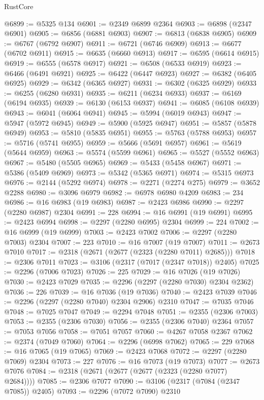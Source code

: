 \begin{lexlean}{RustCore}
\begin{coremodule}
@6899 := @5325 @134
@6901 := @2349 @6899 @2364
@6903 := @6898 (@2347 @6901)
@6905 := @6856 (@6881 @6903)
@6907 := @6813 (@6838 @6905)
@6909 := @6767 (@6792 @6907)
@6911 := @6721 (@6746 @6909)
@6913 := @6677 (@6702 @6911)
@6915 := @6635 (@6660 @6913)
@6917 := @6595 (@6614 @6915)
@6919 := @6555 (@6578 @6917)
@6921 := @6508 (@6533 @6919)
@6923 := @6466 (@6491 @6921)
@6925 := @6422 (@6447 @6923)
@6927 := @6382 (@6405 @6925)
@6929 := @6342 (@6365 @6927)
@6931 := @6302 (@6325 @6929)
@6933 := @6255 (@6280 @6931)
@6935 := @6211 (@6234 @6933)
@6937 := @6169 (@6194 @6935)
@6939 := @6130 (@6153 @6937)
@6941 := @6085 (@6108 @6939)
@6943 := @6041 (@6064 @6941)
@6945 := @5994 (@6019 @6943)
@6947 := @5947 (@5972 @6945)
@6949 := @5900 (@5925 @6947)
@6951 := @5857 (@5878 @6949)
@6953 := @5810 (@5835 @6951)
@6955 := @5763 (@5788 @6953)
@6957 := @5716 (@5741 @6955)
@6959 := @5666 (@5691 @6957)
@6961 := @5619 (@5644 @6959)
@6963 := @5574 (@5599 @6961)
@6965 := @5527 (@5552 @6963)
@6967 := @5480 (@5505 @6965)
@6969 := @5433 (@5458 @6967)
@6971 := @5386 (@5409 @6969)
@6973 := @5342 (@5365 @6971)
@6974 := @5315 @6973
@6976 := @2144 (@5292 @6974)
@6978 := @2271 (@2274 @275)
@6979 := @3652 @2288
@6980 := @3096 @6979
@6982 := @6978 @6980 @4209
@6983 := 234
@6986 := @16 @6983 (@19 @6983)
@6987 := @2423 @6986
@6990 := @2297 (@2280 @6987) @2304
@6991 := 228
@6994 := @16 @6991 (@19 @6991)
@6995 := @2423 @6994
@6998 := @2297 (@2280 @6995) @2304
@6999 := 224
@7002 := @16 @6999 (@19 @6999)
@7003 := @2423 @7002
@7006 := @2297 (@2280 @7003) @2304
@7007 := 223
@7010 := @16 @7007 (@19 @7007)
@7011 := @2673 @7010
@7017 := @2318 (@2671 (@2677 (@2323 (@2280 @7011) @2685)))
@7018 := @2306 @7011
@7023 := @3106 (@2317 (@7017 (@2347 @7018)) @2405)
@7025 := @2296 (@7006 @7023)
@7026 := 225
@7029 := @16 @7026 (@19 @7026)
@7030 := @2423 @7029
@7035 := @2296 (@2297 (@2280 @7030) @2304 @2362)
@7036 := 226
@7039 := @16 @7036 (@19 @7036)
@7040 := @2423 @7039
@7046 := @2296 (@2297 (@2280 @7040) @2304 @2906) @2310
@7047 := @7035 @7046
@7048 := @7025 @7047
@7049 := @2294 @7048
@7051 := @2355 (@2306 @7003)
@7053 := @2355 (@2306 @7030)
@7056 := @2355 (@2306 @7040) @2364
@7057 := @7053 @7056
@7058 := @7051 @7057
@7060 := @4267 @7058 @2367
@7062 := @2374 (@7049 @7060)
@7064 := @2296 (@6998 @7062)
@7065 := 229
@7068 := @16 @7065 (@19 @7065)
@7069 := @2423 @7068
@7072 := @2297 (@2280 @7069) @2304
@7073 := 227
@7076 := @16 @7073 (@19 @7073)
@7077 := @2673 @7076
@7084 := @2318 (@2671 (@2677 (@2677 (@2323 (@2280 @7077) @2684))))
@7085 := @2306 @7077
@7090 := @3106 (@2317 (@7084 (@2347 @7085)) @2405)
@7093 := @2296 (@7072 @7090) @2310

\end{coremodule}
\end{lexlean}
